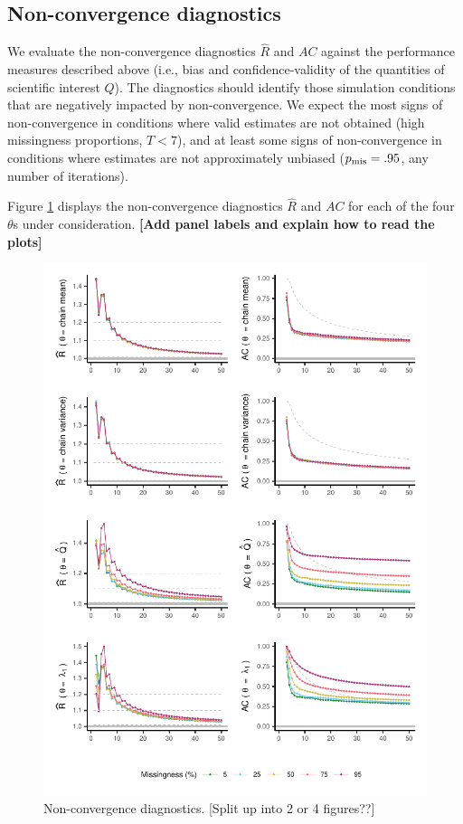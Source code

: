 \documentclass[Royal,times,sageh]{sagej}
\begin{document}
\hypertarget{non-convergence-diagnostics-1}{%
\subsection{Non-convergence diagnostics}\label{non-convergence-diagnostics-1}}

We evaluate the non-convergence diagnostics \(\widehat{R}\) and \(AC\) against the performance measures described above (i.e., bias and confidence-validity of the quantities of scientific interest \(Q\)). The diagnostics should identify those simulation conditions that are negatively impacted by non-convergence. We expect the most signs of non-convergence in conditions where valid estimates are not obtained (high missingness proportions, \(T<7\)), and at least some signs of non-convergence in conditions where estimates are not approximately unbiased (\(p_{\rm mis}=.95\), any number of iterations).

Figure \ref{fig:rhats-acs} displays the non-convergence diagnostics \(\widehat{R}\) and \(AC\) for each of the four \(\theta\)s under consideration. \textbf{{[}Add panel labels and explain how to read the plots{]}}

\begin{figure}

{\centering \includegraphics{2.Manuscript_files/figure-latex/rhats-acs-1} 

}

\caption{Non-convergence diagnostics. [Split up into 2 or 4 figures??]}\label{fig:rhats-acs}
\end{figure}
\end{document}

